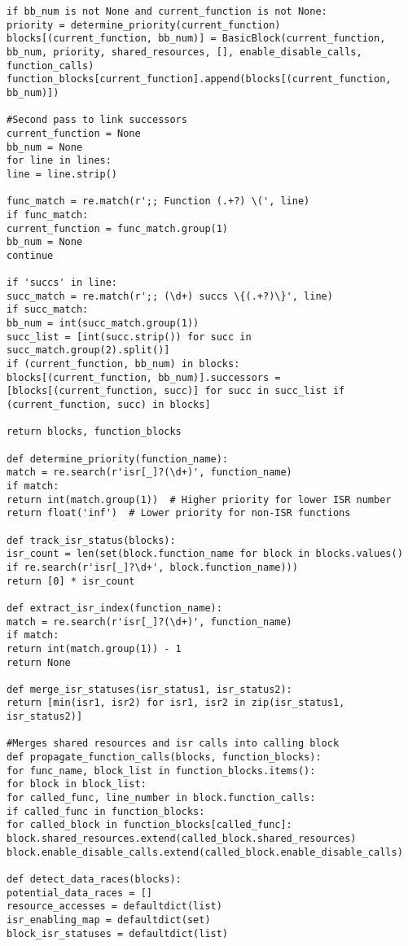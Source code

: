 \documentclass[
fancyheadings, %
%
%
]{stsreprt}
\begin{document}
{\begin{lstlisting}
if bb_num is not None and current_function is not None:
priority = determine_priority(current_function)
blocks[(current_function, bb_num)] = BasicBlock(current_function, bb_num, priority, shared_resources, [], enable_disable_calls, function_calls)
function_blocks[current_function].append(blocks[(current_function, bb_num)])

#Second pass to link successors
current_function = None
bb_num = None
for line in lines:
line = line.strip()

func_match = re.match(r';; Function (.+?) \(', line)
if func_match:
current_function = func_match.group(1)
bb_num = None
continue

if 'succs' in line:
succ_match = re.match(r';; (\d+) succs \{(.+?)\}', line)
if succ_match:
bb_num = int(succ_match.group(1))
succ_list = [int(succ.strip()) for succ in succ_match.group(2).split()]
if (current_function, bb_num) in blocks:
blocks[(current_function, bb_num)].successors = [blocks[(current_function, succ)] for succ in succ_list if (current_function, succ) in blocks]

return blocks, function_blocks

def determine_priority(function_name):
match = re.search(r'isr[_]?(\d+)', function_name)
if match:
return int(match.group(1))  # Higher priority for lower ISR number
return float('inf')  # Lower priority for non-ISR functions

def track_isr_status(blocks):
isr_count = len(set(block.function_name for block in blocks.values() if re.search(r'isr[_]?\d+', block.function_name)))
return [0] * isr_count  

def extract_isr_index(function_name):
match = re.search(r'isr[_]?(\d+)', function_name)
if match:
return int(match.group(1)) - 1
return None

def merge_isr_statuses(isr_status1, isr_status2):
return [min(isr1, isr2) for isr1, isr2 in zip(isr_status1, isr_status2)]

#Merges shared resources and isr calls into calling block
def propagate_function_calls(blocks, function_blocks):
for func_name, block_list in function_blocks.items():
for block in block_list:
for called_func, line_number in block.function_calls:
if called_func in function_blocks:
for called_block in function_blocks[called_func]:
block.shared_resources.extend(called_block.shared_resources)
block.enable_disable_calls.extend(called_block.enable_disable_calls)

def detect_data_races(blocks):
potential_data_races = []
resource_accesses = defaultdict(list)
isr_enabling_map = defaultdict(set)
block_isr_statuses = defaultdict(list)


\end{lstlisting}}
\end{document}
